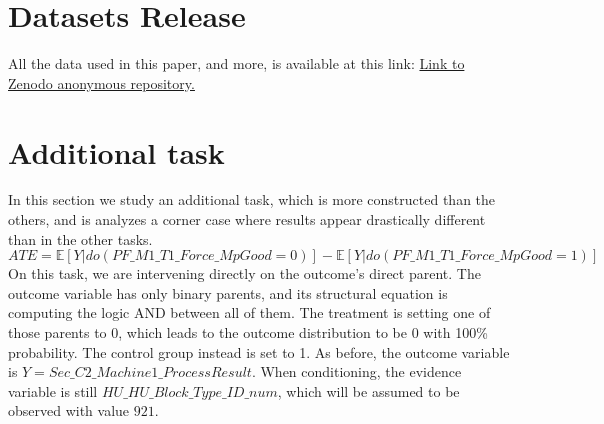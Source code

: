 
\section{Datasets Release}
All the data used in this paper, and more, is available at this link: \href{https://zenodo.org/records/13871097}{Link to Zenodo anonymous repository.}

\section{Additional task} \label{sec:appendix_additional_task}
In this section we study an additional task, which is more constructed than the others, and is analyzes a corner case where results appear drastically different than in the other tasks.
\begin{equation}
    ATE = \mathbb{E}[Y | do(PF\_M1\_T1\_Force\_MpGood=0)] - \mathbb{E}[Y | do(PF\_M1\_T1\_Force\_MpGood=1)]
\end{equation}
On this task, we are intervening directly on the outcome's direct parent. The outcome variable has only binary parents, and its structural equation is computing the logic AND between all of them. The treatment is setting one of those parents to 0, which leads to the outcome distribution to be 0 with 100\% probability. The control group instead is set to 1. As before, the outcome variable is $Y = Sec\_C2\_Machine1\_ProcessResult$. When conditioning, the evidence variable is still $HU\_HU\_Block\_Type\_ID\_num$, which will be assumed to be observed with value $921$.

